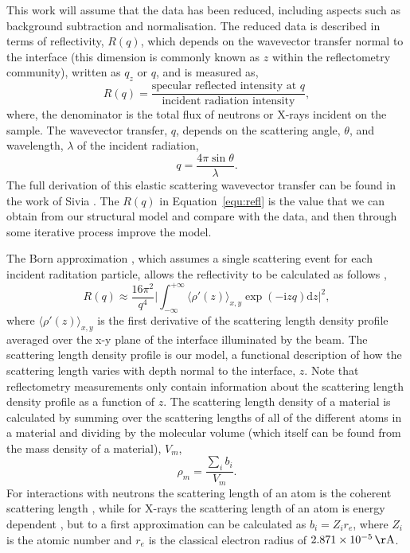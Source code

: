 \documentclass[
 reprint,
 superscriptaddress,
 amsmath,amssymb,
 aps,
]{revtex4-1}
\newcommand{\angstrom}{\rm{\AA}}
\begin{document}
This work will assume that the data has been reduced, including aspects such as background subtraction \cite{salah_data_2007} and normalisation. 
The reduced data is described in terms of reflectivity, $R(q)$, which depends on the wavevector transfer normal to the interface (this dimension is commonly known as $z$ within the reflectometry community), written as $q_z$ or $q$, and is measured as, 
%
\begin{equation}
    R(q) = \frac{\text{specular reflected intensity at }q}{\text{incident radiation intensity}},
    \label{equ:refl}
\end{equation}
%
where, the denominator is the total flux of neutrons or X-rays incident on the sample. 
The wavevector transfer, $q$, depends on the scattering angle, $\theta$, and wavelength, $\lambda$ of the incident radiation, 
%
\begin{equation}
    q = \frac{4\pi\sin\theta}{\lambda}.
    \label{equ:qz}
\end{equation}
%
The full derivation of this elastic scattering wavevector transfer can be found in the work of Sivia \cite{sivia_elementary_2011}. 
The $R(q)$ in Equation~\ref{equ:refl} is the value that we can obtain from our structural model and compare with the data, and then through some iterative process improve the model. 

The Born approximation \cite{born_quantenmechanik_1926}, which assumes a single scattering event for each incident raditation particle, allows the reflectivity to be calculated as follows \cite{sivia_elementary_2011},
%
\begin{equation}
    R(q) \approx \frac{16\pi^2}{q^4} \bigg| \int^{+\infty}_{-\infty}{\langle\rho'(z)\rangle_{x,y}\exp{(-\mathrm{i} zq) \text{d}z} \bigg|^2},
    \label{equ:kine}
\end{equation}
%
where $\langle\rho'(z)\rangle_{x,y}$ is the first derivative of the scattering length density profile averaged over the x-y plane of the interface illuminated by the beam.
The scattering length density profile is our model, a functional description of how the scattering length varies with depth normal to the interface, $z$. 
Note that reflectometry measurements only contain information about the scattering length density profile as a function of $z$.
The scattering length density of a material is calculated by summing over the scattering lengths of all of the different atoms in a material and dividing by the molecular volume (which itself can be found from the mass density of a material), $V_m$,
%
\begin{equation}
    \rho_m = \frac{\sum_i{b_i}}{V_m}.
\end{equation}
%
For interactions with neutrons the scattering length of an atom is the coherent scattering length \cite{sears_neutron_1992,dianoux_neutron_2003}, while for X-rays the scattering length of an atom is energy dependent \cite{seltzer_xray_1995}, but to a first approximation can be calculated as $b_i = Z_ir_e$, where $Z_i$ is the atomic number and $r_e$ is the classical electron radius of $\SI{2.871e-5}{\angstrom}$. 
\end{document}

